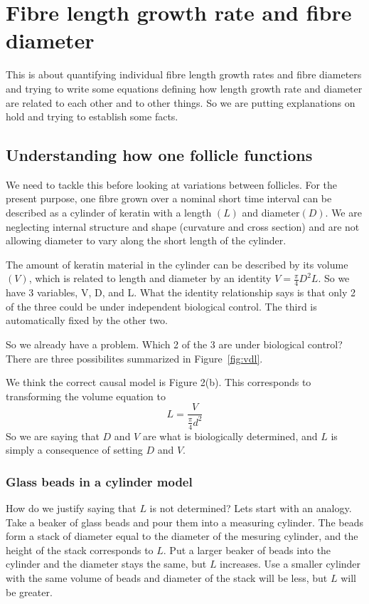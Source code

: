 \documentclass[titlepage]{article}  %
\begin{document}
\section{Fibre length growth rate and fibre diameter}
This is about quantifying individual fibre length growth rates and fibre diameters and trying to write some equations defining how length growth rate and diameter are related to each other and to other things. So we are putting explanations on hold and trying to establish some facts.

\subsection{Understanding how one follicle functions}
We need to tackle this before looking at variations between follicles. For the present purpose, one fibre grown over a nominal short time interval can be described as a cylinder of keratin with a length $(L)$ and diameter$(D)$. We are neglecting internal structure and shape (curvature and cross section) and are not allowing diameter to vary along the short length of the cylinder. 

The amount of keratin material in the cylinder can be described by its volume $(V)$, which is related to length and diameter by an identity $V = \frac{\pi}{4} D^{2} L$. So we have 3 variables, V, D, and L. What the identity relationship says is that only 2 of the three could be under independent biological control.  The third is automatically fixed by the other two. 

So we already have a problem. Which 2 of the 3 are under biological control?  There are three possibilites summarized in Figure~\ref{fig:vdl}.

We think the correct causal model is Figure 2(b). This corresponds to transforming the volume equation to
\begin{displaymath}
L = \frac{V}{\frac{\pi}{4} d^{2}}
\end{displaymath}
So we are saying that $D$ and $V$ are what is biologically determined, and $L$ is simply a consequence of setting $D$ and $V$. 

\subsubsection{Glass beads in a cylinder model}
How do we justify saying that $L$ is not determined? Lets start with an analogy. Take a beaker of glass beads and pour them into a measuring cylinder. The beads form a stack of diameter equal to the diameter of the mesuring cylinder, and the height of the stack corresponds to $L$. Put a larger beaker of beads into the cylinder and the diameter stays the same, but $L$ increases. Use a smaller cylinder with the same volume of beads and diameter of the stack will be less, but $L$ will be greater. 
\end{document}
